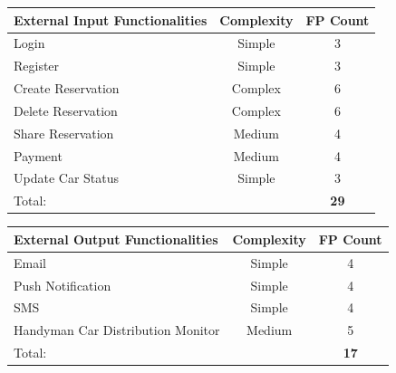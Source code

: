 \documentclass{article}
\begin{document}
			\renewcommand{\arraystretch}{1.2}
			\setlength{\tabcolsep}{12pt}
			\begin{center}
				\begin{tabular}{| p{7cm} | p{2.5cm} | p{1.8cm} |}\hline
					\textbf{External Input Functionalities} & \multicolumn{1}{|c|}{\textbf{Complexity}} & \textbf{FP Count}\\\hline						
					Login & \multicolumn{1}{|c|}{Simple} & \multicolumn{1}{|c|}{3}\\\hline
					Register & \multicolumn{1}{|c|}{Simple} & \multicolumn{1}{|c|}{3}\\\hline
					Create Reservation & \multicolumn{1}{|c|}{Complex} & \multicolumn{1}{|c|}{6}\\\hline
					Delete Reservation & \multicolumn{1}{|c|}{Complex} & \multicolumn{1}{|c|}{6}\\\hline
					Share Reservation & \multicolumn{1}{|c|}{Medium} & \multicolumn{1}{|c|}{4}\\\hline
					Payment & \multicolumn{1}{|c|}{Medium} & \multicolumn{1}{|c|}{4}\\\hline
					Update Car Status & \multicolumn{1}{|c|}{Simple} & \multicolumn{1}{|c|}{3}\\\hline
					\multicolumn{2}{|l|}{Total:} & \multicolumn{1}{|c|}{\textbf{29}}\\\hline	
				\end{tabular}
			\end{center}
		
			\renewcommand{\arraystretch}{1.2}
			\setlength{\tabcolsep}{12pt}
			\begin{center}
				\begin{tabular}{| p{7cm} | p{2.5cm} | p{1.8cm} |}\hline
					\textbf{External Output Functionalities} & \multicolumn{1}{|c|}{\textbf{Complexity}} & \textbf{FP Count}\\\hline
					Email & \multicolumn{1}{|c|}{Simple} & \multicolumn{1}{|c|}{4}\\\hline	
					Push Notification & \multicolumn{1}{|c|}{Simple} & \multicolumn{1}{|c|}{4}\\\hline	
					SMS & \multicolumn{1}{|c|}{Simple} & \multicolumn{1}{|c|}{4}\\\hline
					Handyman Car Distribution Monitor & \multicolumn{1}{|c|}{Medium} & \multicolumn{1}{|c|}{5}\\\hline
					\multicolumn{2}{|l|}{Total:} & \multicolumn{1}{|c|}{\textbf{17}}\\\hline	
				\end{tabular}
			\end{center}
		
\end{document}
